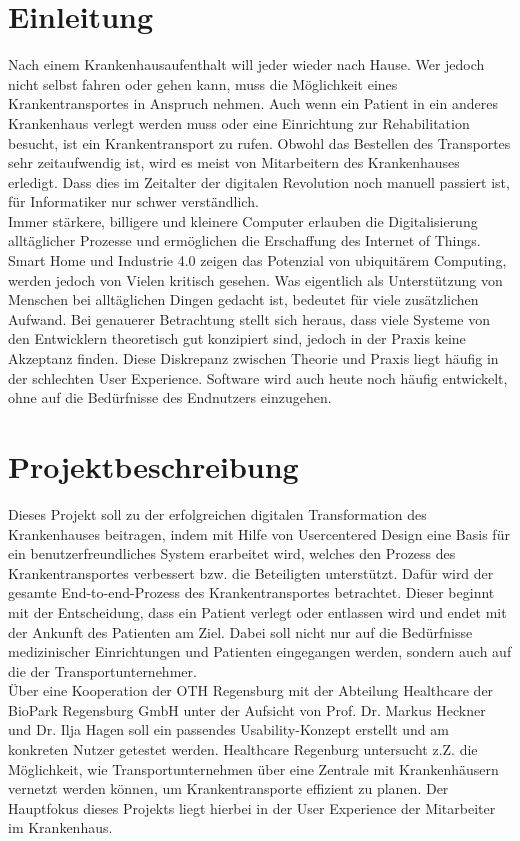 \documentclass[a4paper, ngerman, 12pt]{scrartcl}
\begin{document}
\section{Einleitung}
Nach einem Krankenhausaufenthalt will jeder wieder nach Hause. Wer jedoch nicht selbst fahren oder gehen kann, muss die Möglichkeit eines Krankentransportes in Anspruch nehmen. Auch wenn ein Patient in ein anderes Krankenhaus verlegt werden muss oder eine Einrichtung zur Rehabilitation besucht, ist ein Krankentransport zu rufen. Obwohl das Bestellen des Transportes sehr zeitaufwendig ist, wird es meist von Mitarbeitern des Krankenhauses erledigt. Dass dies im Zeitalter der digitalen Revolution noch manuell passiert ist, für Informatiker nur schwer verständlich.\\

Immer stärkere, billigere und kleinere Computer erlauben die Digitalisierung alltäglicher Prozesse und ermöglichen die Erschaffung des Internet of Things. Smart Home und Industrie 4.0 zeigen das Potenzial von ubiquitärem Computing, werden jedoch von Vielen kritisch gesehen. Was eigentlich als Unterstützung von Menschen bei alltäglichen Dingen gedacht ist, bedeutet für viele zusätzlichen Aufwand. Bei genauerer Betrachtung stellt sich heraus, dass viele Systeme von den Entwicklern theoretisch gut konzipiert sind, jedoch in der Praxis keine Akzeptanz finden. Diese Diskrepanz zwischen Theorie und Praxis liegt häufig in der schlechten User Experience. Software wird auch heute noch häufig entwickelt, ohne auf die Bedürfnisse des Endnutzers einzugehen. 
\section{Projektbeschreibung}
Dieses Projekt soll zu der erfolgreichen digitalen Transformation des Krankenhauses beitragen, indem mit Hilfe von Usercentered Design eine Basis für ein benutzerfreundliches System erarbeitet wird, welches den Prozess des Krankentransportes verbessert bzw. die Beteiligten unterstützt. Dafür wird der gesamte End-to-end-Prozess des Krankentransportes betrachtet. Dieser beginnt mit der Entscheidung, dass ein Patient verlegt oder entlassen wird und endet mit der Ankunft des Patienten am Ziel. Dabei soll nicht nur auf die Bedürfnisse medizinischer Einrichtungen und Patienten eingegangen werden, sondern auch auf die der Transportunternehmer.\\

Über eine Kooperation der OTH Regensburg mit der Abteilung Healthcare der BioPark Regensburg GmbH unter der Aufsicht von Prof. Dr. Markus Heckner und Dr. Ilja Hagen soll ein passendes Usability-Konzept erstellt und am konkreten Nutzer getestet werden. Healthcare Regenburg untersucht z.Z. die Möglichkeit, wie Transportunternehmen über eine Zentrale mit Krankenhäusern vernetzt werden können, um Krankentransporte effizient zu planen. Der Hauptfokus dieses Projekts liegt hierbei in der User Experience der Mitarbeiter im Krankenhaus.
\newpage
\end{document}
